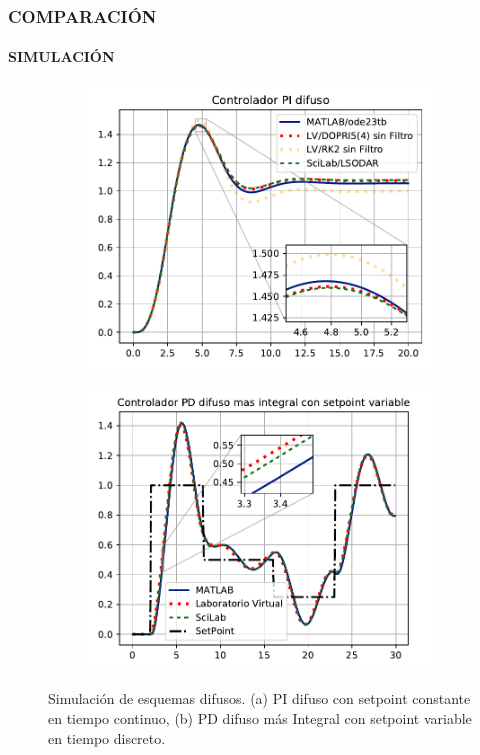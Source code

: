 \documentclass[usenames,xcolor={dvipsnames, table}]{beamer}
\begin{document}
\begin{frame}
	\frametitle{COMPARACIÓN}
	\framesubtitle{SIMULACIÓN}
	\vspace{23pt}
	\begin{figure}[htb]
		\centering
		\begin{subfigure}[t]{0.49\textwidth}
			\centering
			\includegraphics[width=\textwidth]{imagenes/PIcf1.pdf}
			\caption{}
		\end{subfigure}
		\hfill
		\begin{subfigure}[t]{0.49\textwidth}
			\centering
			\includegraphics[width=\textwidth]{imagenes/PDmasId.pdf}
			\caption{}
		\end{subfigure}
		\caption{Simulación de esquemas difusos. (a) PI difuso con setpoint constante en tiempo continuo, (b) PD difuso más Integral con setpoint variable en tiempo discreto.}
	\end{figure}

\end{frame}
\end{document}
